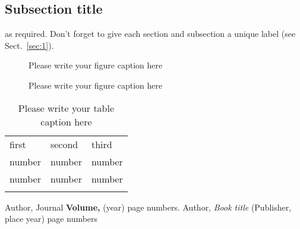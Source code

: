 \subsection{Subsection title}
\label{sec:2}
as required. Don't forget to give each section
and subsection a unique label (see Sect.~\ref{sec:1}).
%
\begin{figure}
\caption{Please write your figure caption here}
\label{fig:1}       %
\end{figure}
%
\begin{figure*}
\vspace*{5cm}       %
\caption{Please write your figure caption here}
\label{fig:2}       %
\end{figure*}
%
\begin{table}
\caption{Please write your table caption here}
\label{tab:1}       %
\begin{tabular}{lll}
\hline\noalign{\smallskip}
first & second & third  \\
\noalign{\smallskip}\hline\noalign{\smallskip}
number & number & number \\
number & number & number \\
\noalign{\smallskip}\hline
\end{tabular}
\vspace*{5cm}  %
\end{table}
%
% 
% 
%
\begin{thebibliography}{}
%
%
Author, Journal \textbf{Volume,} (year) page numbers.
Author, \textit{Book title} (Publisher, place year) page numbers
\end{thebibliography}





